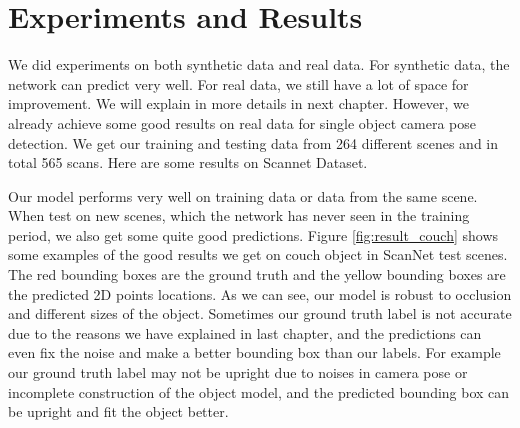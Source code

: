 \chapter{Experiments and Results}

We did experiments on both synthetic data and real data. For synthetic data, the network can predict very well. For real data, we still have a lot of space for improvement. We will explain in more details in next chapter. However, we already achieve some good results on real data for single object camera pose detection. We get our training and testing data from 264 different scenes and in total 565 scans. Here are some results on Scannet Dataset.

Our model performs very well on training data or data from the same scene. When test on new scenes, which the network has never seen in the training period, we also get some quite good predictions. Figure \ref{fig:result_couch} shows some examples of the good results we get on couch object in ScanNet test scenes. The red bounding boxes are the ground truth and the yellow bounding  boxes are the predicted 2D points locations. As we can see, our model is robust to occlusion and different sizes of the object. Sometimes our ground truth label is not accurate due to the reasons we have explained in last chapter, and the predictions can even fix the noise and make a better bounding box than our labels. For example our ground truth label may not be upright due to noises in camera pose or incomplete construction of the object model, and the predicted bounding box can be upright and fit the object better.

